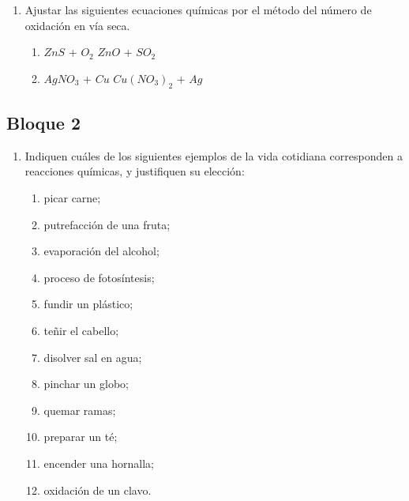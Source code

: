 \documentclass[../Práctica.root.tex]{subfiles}
\begin{document}
\begin{enumerate}
    \item Ajustar las siguientes ecuaciones químicas por el método del número de oxidación en vía
          seca.
          \begin{enumerate}
              \item $ZnS$ + $O_2$ \to $ZnO$ + $SO_2$
              \item $AgNO_3$ + $Cu$ \to $Cu(NO_3)_2$ + $Ag$
          \end{enumerate}
\end{enumerate}
\subsection{Bloque 2}
\begin{enumerate}
    \item Indiquen cuáles de los siguientes ejemplos de la vida cotidiana corresponden a reacciones
          químicas, y justifiquen su elección:
          \begin{enumerate}
              \item picar carne;
              \item putrefacción de una fruta;
              \item evaporación del alcohol;
              \item proceso de fotosíntesis;
              \item fundir un plástico;
              \item teñir el cabello;
              \item disolver sal en agua;
              \item pinchar un globo;
              \item quemar ramas;
              \item preparar un té;
              \item encender una hornalla;
              \item oxidación de un clavo.
          \end{enumerate}


\end{enumerate}
\end{document}
